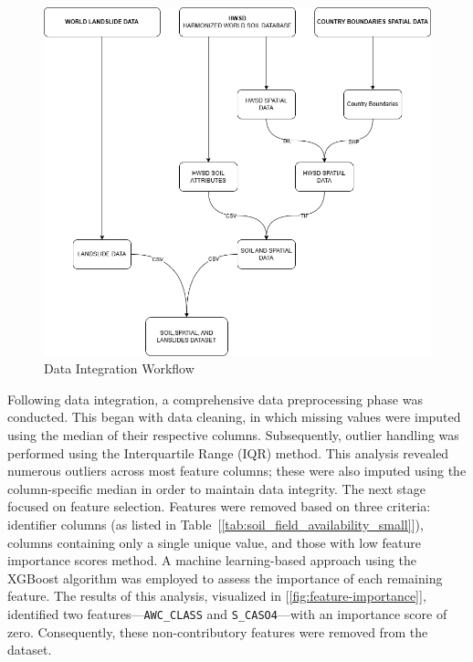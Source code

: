 \begin{figure}[htbp]
    \centerline{\includegraphics[width=\linewidth]{fig3.png}}
    \caption{Data Integration Workflow}
    \label{fig:data-integration-workflow}
\end{figure}

Following data integration, a comprehensive data preprocessing phase was conducted. This began with data cleaning, in which missing values were imputed using the median of their respective columns. Subsequently, outlier handling was performed using the Interquartile Range (IQR) method\cite{mthd01}. This analysis revealed numerous outliers across most feature columns; these were also imputed using the column-specific median in order to maintain data integrity.
The next stage focused on feature selection. Features were removed based on three criteria: identifier columns (as listed in Table~[\ref{tab:soil_field_availability_small}]), columns containing only a single unique value, and those with low feature importance scores method. A machine learning-based approach using the XGBoost algorithm was employed to assess the importance of each remaining feature\cite{mthd02}. The results of this analysis, visualized in [\ref{fig:feature-importance}], identified two features—\texttt{AWC\_CLASS} and \texttt{S\_CASO4}—with an importance score of zero. Consequently, these non-contributory features were removed from the dataset.

